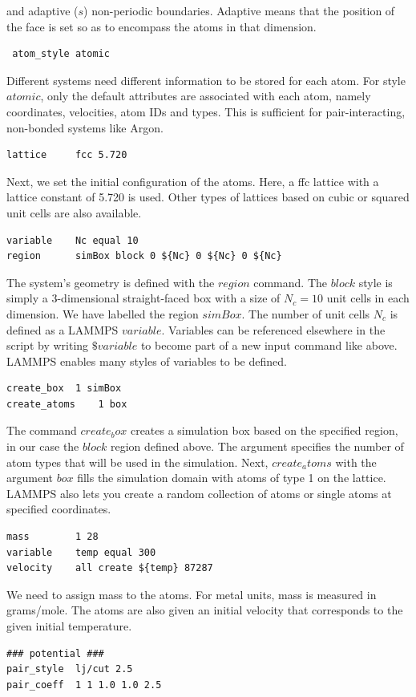 \documentclass[twoside,english]{uiofysmaster}
\begin{document}
and adaptive ($s$) non-periodic boundaries. Adaptive
means that the position of the face is set so as to
encompass the atoms in that dimension. 
\begin{lstlisting}
 atom_style atomic
\end{lstlisting}
Different systems need different information
to be stored for each atom. For style $atomic$, only
the default attributes are associated with each atom, 
namely coordinates, velocities, atom IDs and types. 
This is sufficient for pair-interacting, non-bonded
systems like Argon.
\begin{lstlisting}
lattice 	fcc 5.720
\end{lstlisting}
Next, we set the initial configuration of the atoms. 
Here, a ffc lattice with a lattice constant of
5.720 is used. Other types of lattices based on
cubic or squared unit cells are also available. 
\begin{lstlisting}
variable	Nc equal 10
region 		simBox block 0 ${Nc} 0 ${Nc} 0 ${Nc}
\end{lstlisting}
The system's geometry is defined with the $region$
command. The $block$ style is simply a 3-dimensional
straight-faced box with a size of $N_c = 10$ unit
cells in each dimension. We have labelled the 
region $simBox$. 
The number of unit cells
$N_c$ is defined as a LAMMPS $variable$. Variables
can be referenced elsewhere in the script by
writing $\${variable}$ to become part of a new input
command like above. LAMMPS enables many styles
of variables to be defined. 
\begin{lstlisting}
create_box	1 simBox
create_atoms	1 box
\end{lstlisting}
The command $create_box$ creates a simulation box 
based on the specified region, in our case the 
$block$ region defined above. The argument specifies
the number of atom types that will be used in the
simulation. Next, $create_atoms$ with the argument
$box$ fills the simulation
domain with atoms of type 1 on the lattice. 
LAMMPS also lets you create a random collection
of atoms or single atoms at specified coordinates.
\begin{lstlisting}
mass		1 28
variable	temp equal 300
velocity	all create ${temp} 87287 
\end{lstlisting}
We need to assign mass to the atoms. For metal units, 
mass is measured in grams/mole. The atoms are also
given an initial velocity that corresponds to 
the given initial temperature. 
\begin{lstlisting}
### potential ###
pair_style	lj/cut 2.5
pair_coeff	1 1 1.0 1.0 2.5
\end{lstlisting}
\end{document}
